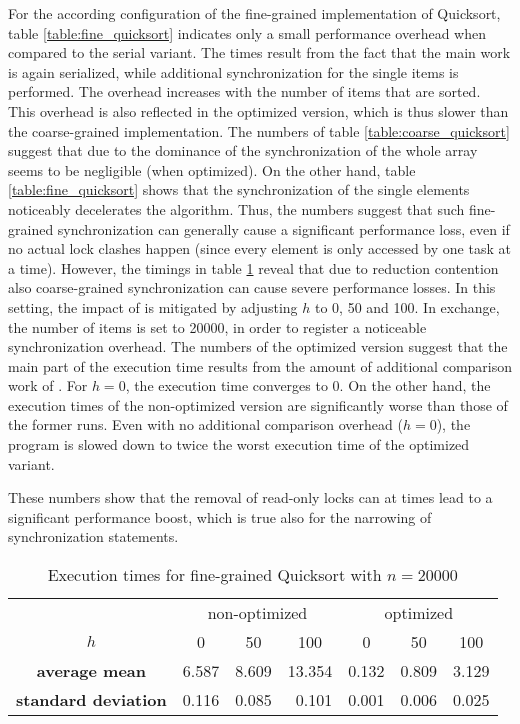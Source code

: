 For the according configuration of the fine-grained implementation of Quicksort, table \ref{table:fine_quicksort} indicates only a small performance overhead when compared to the serial variant. The times result from the fact that the main work is again serialized, while additional synchronization for the single items is performed. The overhead increases with the number of items that are sorted. This overhead is also reflected in the optimized version, which is thus slower than the coarse-grained implementation. The numbers of table \ref{table:coarse_quicksort} suggest that due to the dominance of  the synchronization of the whole array seems to be negligible (when optimized). On the other hand, table \ref{table:fine_quicksort} shows that the synchronization of the single elements noticeably decelerates the algorithm. Thus, the numbers suggest that such fine-grained synchronization can generally cause a significant performance loss, even if no actual lock clashes happen (since every element is only accessed by one task at a time). However, the timings in table \ref{table:fine_quicksort2} reveal that due to reduction contention also coarse-grained synchronization can cause severe performance losses. In this setting, the impact of  is mitigated by adjusting $h$ to 0, 50 and 100. In exchange, the number of items is set to 20000, in order to register a noticeable synchronization overhead. The numbers of the optimized version suggest that the main part of the execution time results from the amount of additional comparison work of . For $h = 0$, the execution time converges to 0. On the other hand, the execution times of the non-optimized version are significantly worse than those of the former runs. Even with no additional comparison overhead ($h = 0$), the program is slowed down to twice the worst execution time of the optimized variant. 

These numbers show that the removal of read-only locks can at times lead to a significant performance boost, which is true also for the narrowing of synchronization statements.

\begin{table}[h!]
\begin{center}
\begin{tabular}{c |c|c|c||c|c|c|}
  \multicolumn{1}{c}{} & \multicolumn{3}{c}{non-optimized} & \multicolumn{3}{c}{optimized}\\ \cline{2-7}
  $h$ & 0 & 50 & 100 & 0 & 50 & 100\\ \cline{2-7}
  \textbf{average mean} & 6.587 & 8.609 & 13.354 & 0.132 & 0.809 & 3.129	\\ \cline{2-7}
  \textbf{standard deviation} & 0.116 & 0.085 & \multicolumn{1}{r||}{0.101} & 0.001 & 0.006 & 0.025\\ \cline{2-7}
\end{tabular}
\caption{Execution times for fine-grained Quicksort with $n = 20000$}
\label{table:fine_quicksort2}
\end{center}
\end{table}

